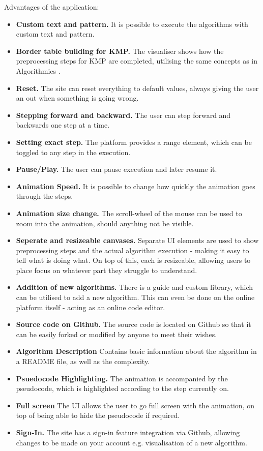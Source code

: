Advantages of the application:
\begin{itemize}
    \item \textbf{Custom text and pattern.} It is possible to execute the algorithms with custom text and pattern.
    \item \textbf{Border table building for KMP.}  The visualiser shows how the preprocessing steps for KMP are completed, utilising the same concepts as in Algorithmics .
    \item \textbf{Reset.} The site can reset everything to default values, always giving the user an out when something is going wrong.
    \item \textbf{Stepping forward and backward.} The user can step forward and backwards one step at a time.
    \item \textbf{Setting exact step.} The platform provides a range element, which can be toggled to any step in the execution.
    \item \textbf{Pause/Play.} The user can pause execution and later resume it.
    \item \textbf{Animation Speed.} It is possible to change how quickly the animation goes through the steps.
    \item \textbf{Animation size change.}  The scroll-wheel of the mouse can be used to zoom into the animation, should anything not be visible.
    \item \textbf{Seperate and resizeable canvases.} Separate UI elements are used to show preprocessing steps and the actual algorithm execution - making it easy to tell what is doing what. On top of this, each is resizeable, allowing users to place focus on whatever part they struggle to understand.
    \item \textbf{Addition of new algorithms.} There is a guide and custom library, which can be utilised to add a new algorithm. This can even be done on the online platform itself - acting as an online code editor.
    \item \textbf{Source code on Github.} The source code is located on Github so that it can be easily forked or modified by anyone to meet their wishes.
    \item \textbf{Algorithm Description} Contains basic information about the algorithm in a README file, as well as the complexity.
    \item \textbf{Psuedocode Highlighting.} The animation is accompanied by the pseudocode, which is highlighted according to the step currently on.
    \item \textbf{Full screen} The UI allows the user to go full screen with the animation, on top of being able to hide the pseudocode if required.
    \item \textbf{Sign-In.} The site has a sign-in feature integration via Github, allowing changes to be made on your account e.g. visualisation of a new algorithm.
\end{itemize}


